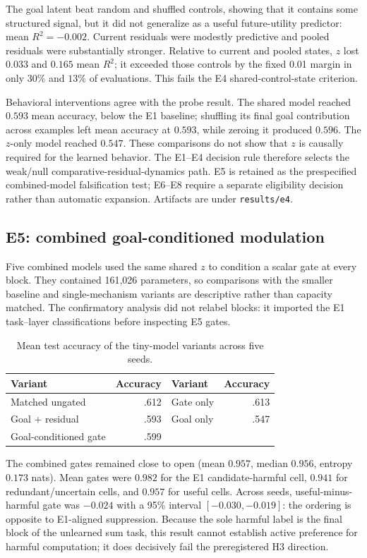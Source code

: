 \documentclass[10pt]{article}
\begin{document}
The goal latent beat random and shuffled controls, showing that it contains some structured signal, but it did not generalize as a useful future-utility predictor: mean $R^2=-0.002$. Current residuals were modestly predictive and pooled residuals were substantially stronger. Relative to current and pooled states, $z$ lost $0.033$ and $0.165$ mean $R^2$; it exceeded those controls by the fixed 0.01 margin in only $30\%$ and $13\%$ of evaluations. This fails the E4 shared-control-state criterion.

Behavioral interventions agree with the probe result. The shared model reached $0.593$ mean accuracy, below the E1 baseline; shuffling its final goal contribution across examples left mean accuracy at $0.593$, while zeroing it produced $0.596$. The $z$-only model reached $0.547$. These comparisons do not show that $z$ is causally required for the learned behavior. The E1--E4 decision rule therefore selects the weak/null comparative-residual-dynamics path. E5 is retained as the prespecified combined-model falsification test; E6--E8 require a separate eligibility decision rather than automatic expansion. Artifacts are under \texttt{results/e4}.

\subsection{E5: combined goal-conditioned modulation}
Five combined models used the same shared $z$ to condition a scalar gate at every block. They contained 161,026 parameters, so comparisons with the smaller baseline and single-mechanism variants are descriptive rather than capacity matched. The confirmatory analysis did not relabel blocks: it imported the E1 task--layer classifications before inspecting E5 gates.

\begin{table}[ht]
\centering
\caption{Mean test accuracy of the tiny-model variants across five seeds.}
\begin{tabular}{lr@{\qquad}lr}
\toprule
Variant & Accuracy & Variant & Accuracy \\
\midrule
Matched ungated & .612 & Gate only & .613 \\
Goal + residual & .593 & Goal only & .547 \\
Goal-conditioned gate & .599 & & \\
\bottomrule
\end{tabular}
\end{table}

The combined gates remained close to open (mean $0.957$, median $0.956$, entropy $0.173$ nats). Mean gates were $0.982$ for the E1 candidate-harmful cell, $0.941$ for redundant/uncertain cells, and $0.957$ for useful cells. Across seeds, useful-minus-harmful gate was $-0.024$ with a 95\% interval $[-0.030,-0.019]$: the ordering is opposite to E1-aligned suppression. Because the sole harmful label is the final block of the unlearned sum task, this result cannot establish active preference for harmful computation; it does decisively fail the preregistered H3 direction.
\end{document}
